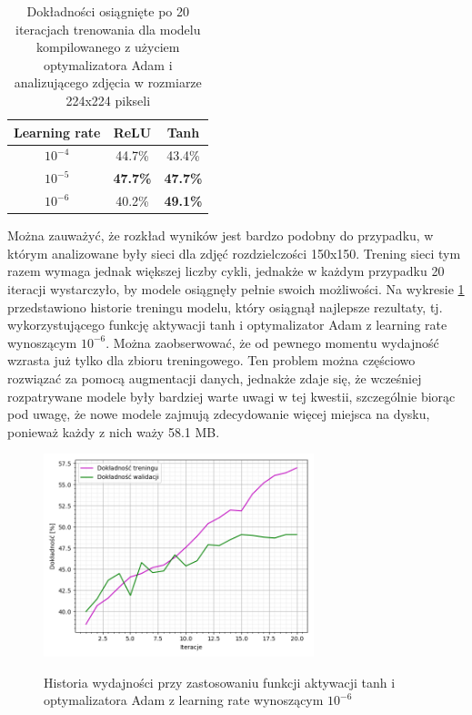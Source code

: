\begin{table}[H]
  \centering
  \caption{Dokładności osiągnięte po 20 iteracjach trenowania dla modelu kompilowanego z użyciem optymalizatora Adam i analizującego zdjęcia w rozmiarze 224x224 pikseli}
    \begin{tabular}{ |c|c|c| }
    \hline
    Learning rate & ReLU & Tanh \\
    \hline
    $10^{-4}$ & 44.7\% & 43.4\% \\
    $10^{-5}$ & \textbf{47.7\%} & \textbf{47.7\%} \\
    $10^{-6}$ & 40.2\% & \textbf{49.1\%} \\
    \hline
    \end{tabular}
  \label{tab:5.5}
\end{table}

Można zauważyć, że rozkład wyników jest bardzo podobny do przypadku, w którym analizowane były sieci dla zdjęć rozdzielczości 150x150. Trening sieci tym razem wymaga jednak większej liczby cykli, jednakże w każdym przypadku 20 iteracji wystarczyło, by modele osiągnęły pełnie swoich możliwości. Na wykresie \ref{pic:5.3} przedstawiono historie treningu modelu, który osiągnął najlepsze rezultaty, tj. wykorzystującego funkcję aktywacji tanh i optymalizator Adam z learning rate wynoszącym $10^{-6}$. Można zaobserwować, że od pewnego momentu wydajność wzrasta już tylko dla zbioru treningowego. Ten problem można częściowo rozwiązać za pomocą augmentacji danych, jednakże zdaje się, że wcześniej rozpatrywane modele były bardziej warte uwagi w tej kwestii, szczególnie biorąc pod uwagę, że nowe modele zajmują zdecydowanie więcej miejsca na dysku, ponieważ każdy z nich waży 58.1 MB.

\begin{figure}[H]
    \caption{Historia wydajności przy zastosowaniu funkcji aktywacji tanh i optymalizatora Adam z learning rate wynoszącym $10^{-6}$}
    \centering
    \includegraphics[width=0.7\textwidth]{wykres3.png}
    \label{pic:5.3}
\end{figure}

